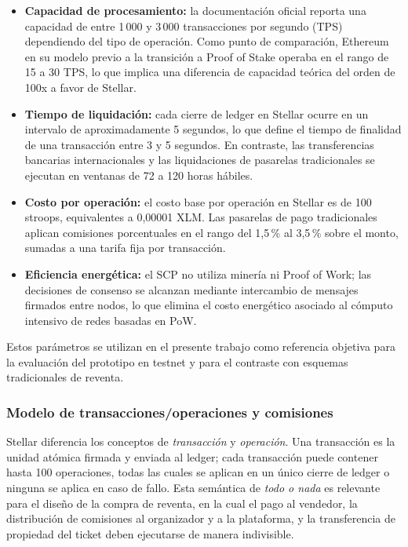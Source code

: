 \begin{itemize}
    \item \textbf{Capacidad de procesamiento:} la documentación oficial reporta una capacidad de entre 1\,000 y 3\,000 transacciones por segundo (TPS) dependiendo del tipo de operación. Como punto de comparación, Ethereum en su modelo previo a la transición a Proof of Stake operaba en el rango de 15 a 30 TPS, lo que implica una diferencia de capacidad teórica del orden de 100x a favor de Stellar.
    \item \textbf{Tiempo de liquidación:} cada cierre de ledger en Stellar ocurre en un intervalo de aproximadamente 5 segundos, lo que define el tiempo de finalidad de una transacción entre 3 y 5 segundos. En contraste, las transferencias bancarias internacionales y las liquidaciones de pasarelas tradicionales se ejecutan en ventanas de 72 a 120 horas hábiles.
    \item \textbf{Costo por operación:} el costo base por operación en Stellar es de 100 stroops, equivalentes a 0{,}00001 XLM. Las pasarelas de pago tradicionales aplican comisiones porcentuales en el rango del 1{,}5\,\% al 3{,}5\,\% sobre el monto, sumadas a una tarifa fija por transacción.
    \item \textbf{Eficiencia energética:} el SCP no utiliza minería ni Proof of Work; las decisiones de consenso se alcanzan mediante intercambio de mensajes firmados entre nodos, lo que elimina el costo energético asociado al cómputo intensivo de redes basadas en PoW.
\end{itemize}

Estos parámetros se utilizan en el presente trabajo como referencia objetiva para la evaluación del prototipo en testnet y para el contraste con esquemas tradicionales de reventa.

\subsubsection{Modelo de transacciones/operaciones y comisiones}

Stellar diferencia los conceptos de \textit{transacción} y \textit{operación}. Una transacción es la unidad atómica firmada y enviada al ledger; cada transacción puede contener hasta 100 operaciones, todas las cuales se aplican en un único cierre de ledger o ninguna se aplica en caso de fallo. Esta semántica de \textit{todo o nada} es relevante para el diseño de la compra de reventa, en la cual el pago al vendedor, la distribución de comisiones al organizador y a la plataforma, y la transferencia de propiedad del ticket deben ejecutarse de manera indivisible.

